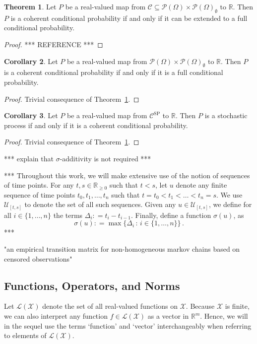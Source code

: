 \documentclass[10pt]{paper}
\theoremstyle{definition}
\newtheorem{theorem}{Theorem}
\newtheorem{corollary}[theorem]{Corollary}
\newcommand{\reals}{\mathbb{R}}
\newcommand{\realsnonneg}{\reals_{\geq 0}}
\newcommand{\states}{\mathcal{X}}
\newcommand{\paths}{\Omega}
\newcommand{\power}{\mathcal{P}(\paths)}
\newcommand{\nonemptypower}{\power_{\emptyset}}
\newcommand{\gambles}{\mathcal{L}}
\newcommand{\gamblesX}{\gambles(\states)}
\newcommand{\coloneqq}{:\!=}
\begin{document}
\begin{theorem}\label{theo:coherentextendable}
Let $P$ be a real-valued map from $\mathcal{C}\subseteq\power\times\nonemptypower$ to $\reals$. Then $P$ is a coherent conditional probability if and only if it can be extended to a full conditional probability.
\end{theorem}
\begin{proof}
*** REFERENCE ***
\end{proof}

\begin{corollary}
Let $P$ be a real-valued map from $\power\times\nonemptypower$ to $\reals$. Then $P$ is a coherent conditional probability if and only if it is a full conditional probability.
\end{corollary}
\begin{proof}
Trivial consequence of Theorem~\ref{theo:coherentextendable}.
\end{proof}

\begin{corollary}
Let $P$ be a real-valued map from $\mathcal{C}^\mathrm{SP}$ to $\reals$. Then $P$ is a stochastic process if and only if it is a coherent conditional probability.
\end{corollary}
\begin{proof}
Trivial consequence of Theorem~\ref{theo:coherentextendable}.
\end{proof}







*** explain that $\sigma$-additivity is not required ***


*** Throughout this work, we will make extensive use of the notion of sequences of time points. For any $t,s\in\realsnonneg$ such that $t<s$, let $u$ denote any finite sequence of time points $t_0,t_1,\ldots,t_n$ such that $t=t_0 < t_1 <\ldots < t_n = s$. We use $\mathcal{U}_{[t,s]}$ to denote the set of all such sequences. 
Given any $u\in\mathcal{U}_{[t,s]}$, we define for all $i\in\{1,\ldots,n\}$ the terms $\Delta_i\coloneqq t_i-t_{i-1}$.  Finally, define a function $\sigma(u)$, as
\begin{equation*}
\sigma(u) \coloneqq \max\bigl\{\Delta_i\,:\,i\in\{1,\ldots,n\}\bigr\}\,.
\end{equation*}
***

"an empirical transition matrix for non-homogeneous markov chains based on censored observations"

\subsection{Functions, Operators, and Norms}\label{sec:func_oper_norm}
Let $\gamblesX$ denote the set of all real-valued functions on $\states$. Because $\states$ is finite, we can also interpret any function $f\in\gamblesX$ as a vector in $\reals^m$. Hence, we will in the sequel use the terms `function' and `vector' interchangeably when referring to elements of $\gamblesX$.
\end{document}
